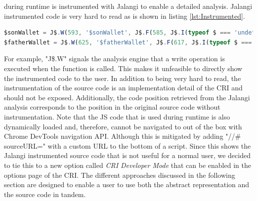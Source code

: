 during runtime is instrumented with Jalangi to enable a detailed analysis. Jalangi instrumented code is very hard to read as is shown in listing \ref{lst:Instrumented}.

\begin{lstlisting}[language=JavaScript, caption={Example of RxJS code.},label={lst:Instrumented}]
$sonWallet = J$.W(593, '$sonWallet', J$.F(585, J$.I(typeof $ === 'undefined' ? $ = J$.R(569, '$', undefined, true, true) : $ = J$.R(569, '$', $, true, true)), false)(J$.T(577, '#wallet-son', 21, false)), J$.I(typeof $sonWallet === 'undefined' ? undefined : $sonWallet), true, true);
$fatherWallet = J$.W(625, '$fatherWallet', J$.F(617, J$.I(typeof $ === 'undefined' ? $ = J$.R(601, '$', undefined, true, true) : $ = J$.R(601, '$', $, true, true)), false)(J$.T(609, '#wallet-father', 21, false)), J$.I(typeof $fatherWallet === 'undefined' ? undefined : $fatherWallet), true, true);
\end{lstlisting}

For example, "J\$.W" signals the analysis engine that a write operation is executed when the function is called. This makes it unfeasible to directly show the instrumented code to the user. In addition to being very hard to read, the instrumentation of the source code is an implementation detail of the CRI and should not be exposed. Additionally, the code position retrieved from the Jalangi analysis corresponds to the position in the original source code without instrumentation. Note that the JS code that is used during runtime is also dynamically loaded and, therefore, cannot be navigated to out of the box with Chrome DevTools navigation API. Although this is mitigated by adding "//\# sourceURL=" with a custom URL to the bottom of a script. Since this shows the Jalangi instrumented source code that is not useful for a normal user, we decided to tie this to a new option called \emph{CRI Developer Mode} that can be enabled in the options page of the CRI. The different approaches discussed in the following section are designed to enable a user to use both the abstract representation and the source code in tandem.
	
